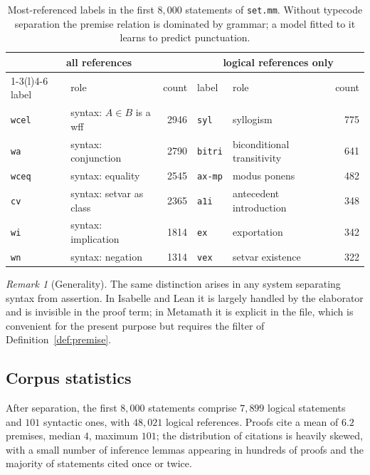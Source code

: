 \documentclass[11pt]{article}
\theoremstyle{plain}
\theoremstyle{definition}
\theoremstyle{remark}
\newtheorem{remark}[theorem]{Remark}
\begin{document}
\begin{table}[htbp]\centering
\small
\begin{tabular}{@{}llrllr@{}}
\toprule
\multicolumn{3}{c}{\textbf{all references}} & \multicolumn{3}{c}{\textbf{logical references only}}\\
\cmidrule(r){1-3}\cmidrule(l){4-6}
label & role & count & label & role & count\\
\midrule
\texttt{wcel} & syntax: $A\in B$ is a wff & 2946 & \texttt{syl} & syllogism & 775\\
\texttt{wa}   & syntax: conjunction & 2790 & \texttt{bitri} & biconditional transitivity & 641\\
\texttt{wceq} & syntax: equality & 2545 & \texttt{ax-mp} & modus ponens & 482\\
\texttt{cv}   & syntax: setvar as class & 2365 & \texttt{a1i} & antecedent introduction & 348\\
\texttt{wi}   & syntax: implication & 1814 & \texttt{ex} & exportation & 342\\
\texttt{wn}   & syntax: negation & 1314 & \texttt{vex} & setvar existence & 322\\
\bottomrule
\end{tabular}
\caption{Most-referenced labels in the first $8{,}000$ statements of
\texttt{set.mm}. Without typecode separation the premise relation is dominated by
grammar; a model fitted to it learns to predict punctuation.}
\label{tab:cited}
\end{table}

\begin{remark}[Generality]
The same distinction arises in any system separating syntax from assertion. In
Isabelle and Lean it is largely handled by the elaborator and is invisible in the
proof term; in Metamath it is explicit in the file, which is convenient for the
present purpose but requires the filter of Definition~\ref{def:premise}.
\end{remark}

\subsection{Corpus statistics}

After separation, the first $8{,}000$ statements comprise $7{,}899$ logical
statements and $101$ syntactic ones, with $48{,}021$ logical references. Proofs
cite a mean of $6.2$ premises, median $4$, maximum $101$; the distribution of
citations is heavily skewed, with a small number of inference lemmas appearing
in hundreds of proofs and the majority of statements cited once or twice.
\end{document}
